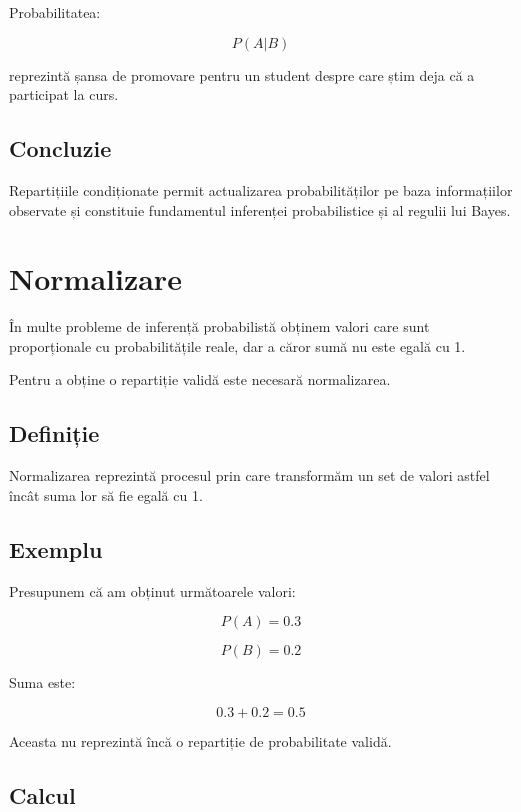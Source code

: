 \documentclass[12pt,a4paper]{article}
\begin{document}
Probabilitatea:

\[
P(A|B)
\]

reprezintă șansa de promovare pentru un student despre care știm deja că a participat la curs.

\subsection{Concluzie}

Repartițiile condiționate permit actualizarea probabilităților pe baza informațiilor observate și constituie fundamentul inferenței probabilistice și al regulii lui Bayes.










\section{Normalizare}

În multe probleme de inferență probabilistă obținem valori care sunt proporționale cu probabilitățile reale, dar a căror sumă nu este egală cu 1.

Pentru a obține o repartiție validă este necesară normalizarea.

\subsection{Definiție}

Normalizarea reprezintă procesul prin care transformăm un set de valori astfel încât suma lor să fie egală cu 1.

\subsection{Exemplu}

Presupunem că am obținut următoarele valori:

\[
P(A)=0.3
\]

\[
P(B)=0.2
\]

Suma este:

\[
0.3+0.2=0.5
\]

Aceasta nu reprezintă încă o repartiție de probabilitate validă.

\subsection{Calcul}
\end{document}
